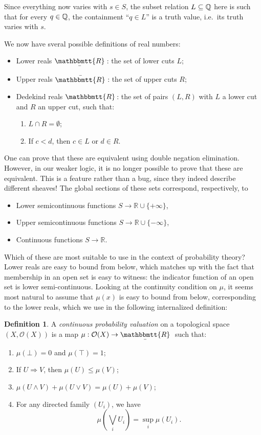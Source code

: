 \documentclass[11pt, oneside, article]{memoir}
\theoremstyle{plain}
\theoremstyle{definition}
\newtheorem{definition}[theorem]{Definition}
\theoremstyle{remark}
\newcommand{\Open}[1]{\mathcal{O}(#1)}
\newcommand{\R}{\mathbb{R}}
\newcommand{\ubar}[1]{\underaccent{\bar}{#1}}
\newcommand{\internal}[1]{\raisebox{-.03ex}{$\mathbbmtt{#1}$}}
\newcommand{\hs}{\hspace{1.1pt}}
\newcommand{\tRR}{\internal{R}\hs}
\newcommand{\tLR}{\ubar{\tRR}\hs}
\newcommand{\tUR}{\bar{\tRR}\hs}
\begin{document}
Since everything now varies with $s\in S$, the subset relation $L \subseteq \mathbb{Q}$ here is such that for every $q\in\mathbb{Q}$, the containment ``$q\in L$'' is a truth value, i.e.~its truth varies with $s$.

We now have sveral possible definitions of real numbers:

\begin{itemize}
\item Lower reals $\tLR$: the set of lower cuts $L$;
\item Upper reals $\tUR$: the set of upper cuts $R$;
\item Dedekind reals $\tRR$: the set of pairs $(L,R)$ with $L$ a lower cut and $R$ an upper cut, such that:
\begin{enumerate}
\item $L \cap R = \emptyset$;
\item If $c < d$, then $c\in L$ or $d\in R$.
\end{enumerate}
\end{itemize}

One can prove that these are equivalent using double negation elimination. However, in our weaker logic, it is no longer possible to prove that these are equivalent. This is a feature rather than a bug, since they indeed describe different sheaves! The global sections of these sets correspond, respectively, to

\begin{itemize}
\item Lower semicontinuous functions $S \to \R \cup \{+\infty\}$,
\item Upper semicontinuous functions $S \to \R \cup \{-\infty\}$,
\item Continuous functions $S \to \R$.
\end{itemize}

Which of these are most suitable to use in the context of probability theory? Lower reals are easy to bound from below, which matches up with the fact that membership in an open set is easy to witness: the indicator function of an open set is lower semi-continuous. Looking at the continuity condition on $\mu$, it seems most natural to assume that $\mu(x)$ is easy to bound from below, corresponding to the lower reals, which we use in the following internalized definition:

\begin{definition}
	A \emph{continuous probability valuation} on a topological space $(X,\Open{X})$ is a map $\mu : \Open{X} \to \tLR$ such that:
\begin{enumerate}
\item $\mu(\bot) = 0$ and $\mu(\top) = 1$;
\item If $U\Rightarrow V$, then $\mu(U) \leq \mu(V)$;
\item $\mu(U \land V) + \mu(U \lor V) = \mu(U) + \mu(V)$;
\item For any directed family $(U_i)$, we have
\[
	\mu\left( \bigvee_i U_i \right) = \sup_i \mu(U_i).
\]
\end{enumerate}
\end{definition}
\end{document}
